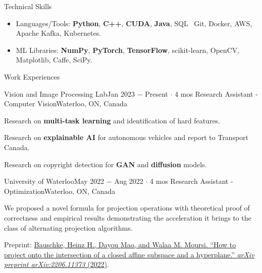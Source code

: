 \documentclass{resume}
\begin{document}
\begin{rSection}{Technical Skills}

    \begin{itemize}
        \item Languages/Tools: \textbf{Python}, \textbf{C++}, \textbf{CUDA}, \textbf{Java}, SQL \textbar\ Git, Docker, AWS, Apache Kafka, Kubernetes.
        \item ML Libraries: \textbf{NumPy}, \textbf{PyTorch}, \textbf{TensorFlow}, scikit-learn, OpenCV, Matplotlib, Caffe, SciPy.
    \end{itemize}

\end{rSection}

\begin{rSection}{Work Experiences}

    \begin{rSubsection}{Vision and Image Processing Lab}{Jan 2023 \(-\) Present \(\cdot\) 4 mos}
        {Research Assistant - Computer Vision}{Waterloo, ON, Canada}
        \item Research on \textbf{multi-task learning} and identification of hard features.
        \item Research on \textbf{explainable AI} for autonomous vehicles and report to Transport Canada.
        \item Research on copyright detection for \textbf{GAN} and \textbf{diffusion} models.
    \end{rSubsection}

    \begin{rSubsection}{University of Waterloo}{May 2022 \(-\) Aug 2022 \(\cdot\) 4 mos}
        {Research Assistant - Optimization}{Waterloo, ON, Canada}
        \item We proposed a novel formula for projection operations with theoretical proof of correctness and empirical results demonstrating the acceleration it brings to the class of alternating projection algorithms.
        \item Preprint: \href{https://arxiv.org/abs/2206.11373}{Bauschke, Heinz H., Dayou Mao, and Walaa M. Moursi. ``How to project onto the intersection of a closed affine subspace and a hyperplane.'' \textit{arXiv preprint arXiv:2206.11373} (2022)}.
    \end{rSubsection}


\end{rSection}
\end{document}
